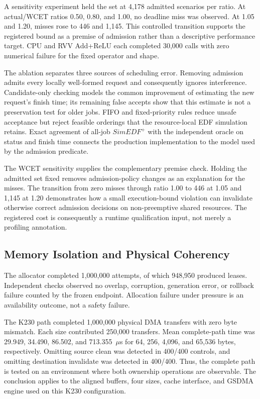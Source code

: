 \documentclass[lettersize,journal]{IEEEtran}
\begin{document}
A sensitivity experiment held the set at 4,178 admitted scenarios per ratio.
At actual/WCET ratios 0.50, 0.80, and 1.00, no deadline miss was observed. At
1.05 and 1.20, misses rose to 446 and 1,145. This controlled transition supports
the registered bound as a premise of admission rather than a descriptive
performance target. CPU and RVV Add+ReLU each completed 30,000 calls with zero
numerical failure for the fixed operator and shape.

The ablation separates three sources of scheduling error. Removing admission
admits every locally well-formed request and consequently ignores interference.
Candidate-only checking models the common improvement of estimating the new
request's finish time; its remaining false accepts show that this estimate is
not a preservation test for older jobs. FIFO and fixed-priority rules reduce
unsafe acceptance but reject feasible orderings that the resource-local EDF
simulation retains. Exact agreement of all-job $SimEDF^+$ with the independent
oracle on status and finish time connects the production implementation to the
model used by the admission predicate.

The WCET sensitivity supplies the complementary premise check. Holding the
admitted set fixed removes admission-policy changes as an explanation for the
misses. The transition from zero misses through ratio 1.00 to 446 at 1.05 and
1,145 at 1.20 demonstrates how a small execution-bound violation can invalidate
otherwise correct admission decisions on non-preemptive shared resources. The
registered cost is consequently a runtime qualification input, not merely a
profiling annotation.

\subsection{Memory Isolation and Physical Coherency}
The allocator completed 1,000,000 attempts, of which 948,950 produced leases.
Independent checks observed no overlap, corruption, generation error, or
rollback failure counted by the frozen endpoint. Allocation failure under
pressure is an availability outcome, not a safety failure.

The K230 path completed 1,000,000 physical DMA transfers with zero byte
mismatch. Each size contributed 250,000 transfers. Mean complete-path time was
29.949, 34.490, 86.502, and 713.355~$\mu$s for 64, 256, 4,096, and 65,536 bytes,
respectively. Omitting source clean was detected in 400/400 controls, and
omitting destination invalidate was detected in 400/400. Thus, the complete
path is tested on an environment where both ownership operations are
observable. The conclusion applies to the aligned buffers, four sizes, cache
interface, and GSDMA engine used on this K230 configuration.
\end{document}
